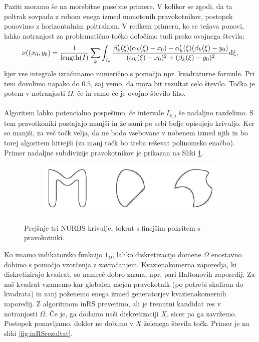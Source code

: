 \documentclass{article}
\begin{document}
Paziti moramo še na morebitne posebne primere. V kolikor se zgodi, da ta poltrak sovpada z robom enega izmed monotonih pravokotnikov, postopek ponovimo z horizontalnim poltrakom. V redkem primeru, ko se težava ponovi, lahko notranjost za problematično točko določimo tudi preko ovojnega števila:
\begin{equation}
\nu((x_0,y_0) = \frac{1}{\mathrm{length}(I)} \sum_k \int_{I_k} \frac{\beta_k'(\xi) (\alpha_k(\xi) - x_0)-\alpha_k'(\xi) (\beta_k(\xi)-y_0)}{(\alpha_k(\xi)-x_0)^2 + (\beta_k(\xi)-y_0)^2} \textup{d}\xi,
\end{equation}
kjer vse integrale izračunamo numerično s pomočjo npr. kvadraturne formule. Pri tem dovolimo napako do $0.5$, saj vemo, da mora bit rezultat celo število. Točka je potem v notranjosti $\Omega$, če in samo če je ovojno število liho.
\\
\\
Algoritem lahko potencialno pospešimo, če intervale $I_{k,j}$ še nadaljno razdelimo. S tem pravotkoniki postajajo manjši in že sami po sebi bolje opisujejo krivuljo. Ker so manjši, za več točk velja, da ne bodo vsebovane v nobenem izmed njih in bo torej algoritem hitrejši (za manj točk bo treba reševat polinomsko enačbo). Primer nadaljne subdivizije pravokotnikov je prikazan na Sliki \ref{fig:pokritjeFino}.
\begin{figure}[H]
\centering
\begin{subfigure}{.8\textwidth}
\includegraphics[width=\linewidth]{Slike/inRS_pokritje_fino.png}
\end{subfigure}
\caption{Prejšnje tri NURBS krivulje, tokrat s finejšim pokritem s pravokotniki.}
\label{fig:pokritjeFino}
\end{figure}
Ko imamo indikatorsko funkcijo $1_\Omega$, lahko diskretizacijo domene $\Omega$ enostavno dobimo s pomočjo vzorčenja z zavračanjem.
Kvazienakomerna zaporedja, ki diskretizirajo kvadrat, so namreč dobro znana, npr. pari Haltonovih zaporedij.
Za naš kvadrat vzamemo kar globalen mejen pravokotnik (po potrebi skaliran do kvadrata) in zanj poženemo enega izmed generatorjev kvazienakomernih zaporedij. Z algoritmom inRS preverimo, ali je trenutni kandidat res v notranjosti $\Omega$. Če je, ga dodamo naši diskretizaciji $X$, sicer pa ga zavržemo. Postopek ponavljamo, dokler ne dobimo v $X$ želenega števila točk. Primer je na sliki \ref{fig:inRSrezultat}.
\end{document}
